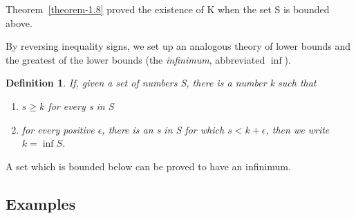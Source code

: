 \documentclass[12pt]{scrbook}
\newtheorem*{definition}{Definition}
\begin{document}
Theorem~\ref{theorem-1.8} proved the existence of K when the set S is bounded above. 

By reversing inequality signs, we set up an analogous theory of lower bounds and the greatest of the lower bounds (the {\em infinimum}, abbreviated $\inf$). 

\begin{definition}
\label{def-infinimum}
If, given a set of numbers S, there is a number k such that 
\begin{enumerate}
	\item $s \ge k$ for every s in S
	\item for every positive $\epsilon$, there is an s in S for which $s < k + \epsilon$, then we write $k = \inf S$.
\end{enumerate}
\end{definition}

A set which is bounded below can be proved to have an infinimum.

\subsection{Examples}
\end{document}
